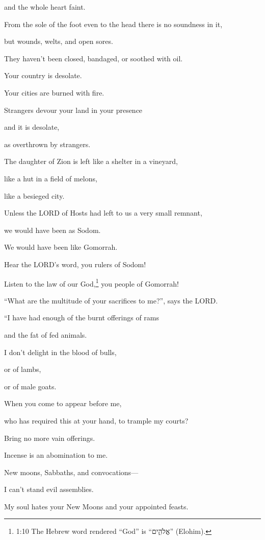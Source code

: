 and the whole heart faint.

\myverse{}From the sole of the foot even to the head there is no soundness
in it,

but wounds, welts, and open sores.

They haven’t been closed, bandaged, or soothed with oil.

\myverse{}Your country is desolate.

Your cities are burned with fire.

Strangers devour your land in your presence

and it is desolate,

as overthrown by strangers.

\myverse{}The daughter of Zion is left like a shelter in a vineyard,

like a hut in a field of melons,

like a besieged city.

\myverse{}Unless the LORD of Hosts had left to us a very small remnant,

we would have been as Sodom.

We would have been like Gomorrah.


\vspace{\baselineskip} \myverse{}Hear the LORD’s word, you rulers of Sodom!

Listen to the law of our God,\footnote{1:10 The Hebrew word rendered “God” is “אֱלֹהִ֑ים” (Elohim).} you people of Gomorrah!

\myverse{}“What are the multitude of your sacrifices to me?”, says the
LORD.

“I have had enough of the burnt offerings of rams

and the fat of fed animals.

I don’t delight in the blood of bulls,

or of lambs,

or of male goats.

\myverse{}When you come to appear before me,

who has required this at your hand, to trample my courts?

\myverse{}Bring no more vain offerings.

Incense is an abomination to me.

New moons, Sabbaths, and convocations—

I can’t stand evil assemblies.

\myverse{}My soul hates your New Moons and your appointed feasts.

